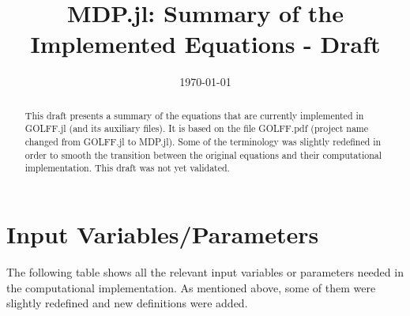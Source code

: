 \documentclass[12pt]{article}
\begin{document}
\title{MDP.jl: Summary of the Implemented Equations - Draft}

\date{\today}

%
\maketitle

\begin{abstract}
This draft presents a summary of the equations that are currently implemented in GOLFF.jl (and its auxiliary files). It is based on the file GOLFF.pdf (project name changed from GOLFF.jl to MDP.jl). 
Some of the terminology was slightly redefined in order to smooth the transition between the original equations and their computational implementation. This draft was not yet validated.
\end{abstract}

\section{Input Variables/Parameters}

The following table shows all the relevant input variables or parameters needed in the computational implementation. As mentioned above, some of them were slightly redefined and new definitions were added. 
\end{document}
